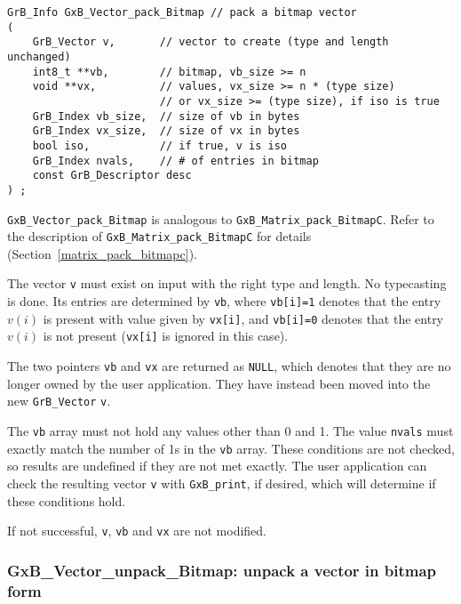 \documentclass[12pt]{article}
\begin{document}
\begin{mdframed}[userdefinedwidth=6in]
{\footnotesize
\begin{verbatim}
GrB_Info GxB_Vector_pack_Bitmap // pack a bitmap vector
(
    GrB_Vector v,       // vector to create (type and length unchanged)
    int8_t **vb,        // bitmap, vb_size >= n
    void **vx,          // values, vx_size >= n * (type size)
                        // or vx_size >= (type size), if iso is true
    GrB_Index vb_size,  // size of vb in bytes
    GrB_Index vx_size,  // size of vx in bytes
    bool iso,           // if true, v is iso
    GrB_Index nvals,    // # of entries in bitmap
    const GrB_Descriptor desc
) ;
\end{verbatim}
} \end{mdframed}

\noindent
\verb'GxB_Vector_pack_Bitmap' is analogous to
\verb'GxB_Matrix_pack_BitmapC'.  Refer to the description of
\verb'GxB_Matrix_pack_BitmapC' for details
(Section~\ref{matrix_pack_bitmapc}).

The vector \verb'v' must
exist on input with the right type and length.  No typecasting is done.
Its entries are determined by \verb'vb', where \verb'vb[i]=1' denotes that
the entry $v(i)$ is present with value given by \verb'vx[i]', and
\verb'vb[i]=0' denotes that the entry $v(i)$ is not present (\verb'vx[i]' is
ignored in this case).

The two pointers \verb'vb' and \verb'vx' are returned as \verb'NULL', which
denotes that they are no longer owned by the user application.  They have
instead been moved into the new \verb'GrB_Vector' \verb'v'.

The \verb'vb' array must not hold any values other than 0 and 1.  The value
\verb'nvals' must exactly match the number of 1s in the \verb'vb' array.  These
conditions are not checked, so results are undefined if they are not met
exactly.  The user application can check the resulting vector \verb'v' with
\verb'GxB_print', if desired, which will determine if these conditions hold.

If not successful, \verb'v', \verb'vb' and
\verb'vx' are not modified.

\newpage
\subsubsection{{\sf GxB\_Vector\_unpack\_Bitmap:} unpack a vector in bitmap form}
\label{vector_unpack_bitmap}
\end{document}
